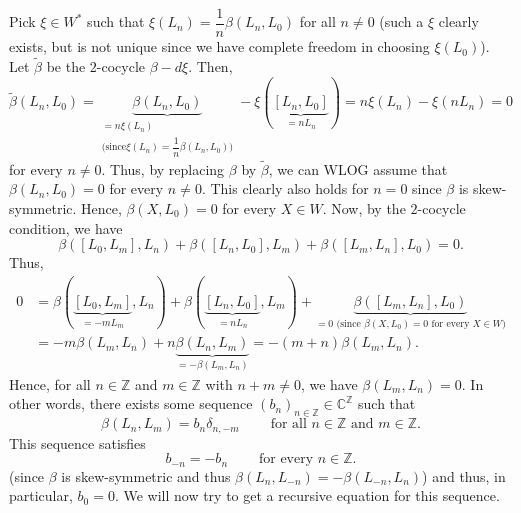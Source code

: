 \documentclass
[numbers=enddot,12pt,final,onecolumn,german,notitlepage]{scrartcl}%
\theoremstyle{definition}
\begin{document}
Pick $\xi\in W^{\ast}$ such that $\xi\left(  L_{n}\right)  =\dfrac{1}{n}%
\beta\left(  L_{n},L_{0}\right)  $ for all $n\neq0$ (such a $\xi$ clearly
exists, but is not unique since we have complete freedom in choosing
$\xi\left(  L_{0}\right)  $). Let $\widetilde{\beta}$ be the $2$-cocycle
$\beta-d\xi$. Then,
\[
\widetilde{\beta}\left(  L_{n},L_{0}\right)  =\underbrace{\beta\left(
L_{n},L_{0}\right)  }_{\substack{=n\xi\left(  L_{n}\right)  \\\text{(since
}\xi\left(  L_{n}\right)  =\dfrac{1}{n}\beta\left(  L_{n},L_{0}\right)
\text{)}}}-\xi\left(  \underbrace{\left[  L_{n},L_{0}\right]  }_{=nL_{n}%
}\right)  =n\xi\left(  L_{n}\right)  -\xi\left(  nL_{n}\right)  =0
\]
for every $n\neq0$. Thus, by replacing $\beta$ by $\widetilde{\beta}$, we can
WLOG assume that $\beta\left(  L_{n},L_{0}\right)  =0$ for every $n\neq0$.
This clearly also holds for $n=0$ since $\beta$ is skew-symmetric. Hence,
$\beta\left(  X,L_{0}\right)  =0$ for every $X\in W$. Now, by the $2$-cocycle
condition, we have%
\[
\beta\left(  \left[  L_{0},L_{m}\right]  ,L_{n}\right)  +\beta\left(  \left[
L_{n},L_{0}\right]  ,L_{m}\right)  +\beta\left(  \left[  L_{m},L_{n}\right]
,L_{0}\right)  =0.
\]
Thus,%
\begin{align*}
0  &  =\beta\left(  \underbrace{\left[  L_{0},L_{m}\right]  }_{=-mL_{m}}%
,L_{n}\right)  +\beta\left(  \underbrace{\left[  L_{n},L_{0}\right]
}_{=nL_{n}},L_{m}\right)  +\underbrace{\beta\left(  \left[  L_{m}%
,L_{n}\right]  ,L_{0}\right)  }_{=0\text{ (since }\beta\left(  X,L_{0}\right)
=0\text{ for every }X\in W\text{)}}\\
&  =-m\beta\left(  L_{m},L_{n}\right)  +n\underbrace{\beta\left(  L_{n}%
,L_{m}\right)  }_{=-\beta\left(  L_{m},L_{n}\right)  }=-\left(  m+n\right)
\beta\left(  L_{m},L_{n}\right)  .
\end{align*}
Hence, for all $n\in\mathbb{Z}$ and $m\in\mathbb{Z}$ with $n+m\neq0$, we have
$\beta\left(  L_{m},L_{n}\right)  =0$. In other words, there exists some
sequence $\left(  b_{n}\right)  _{n\in\mathbb{Z}}\in\mathbb{C}^{\mathbb{Z}}$
such that
\begin{equation}
\beta\left(  L_{n},L_{m}\right)  =b_{n}\delta_{n,-m}%
\ \ \ \ \ \ \ \ \ \ \text{for all }n\in\mathbb{Z}\text{ and }m\in\mathbb{Z}.
\label{thm.H^2(W).pf.2}%
\end{equation}
This sequence satisfies
\begin{equation}
b_{-n}=-b_{n}\ \ \ \ \ \ \ \ \ \ \text{for every }n\in\mathbb{Z}.
\label{thm.H^2(W).pf.1}%
\end{equation}
(since $\beta$ is skew-symmetric and thus $\beta\left(  L_{n},L_{-n}\right)
=-\beta\left(  L_{-n},L_{n}\right)  $) and thus, in particular, $b_{0}=0$. We
will now try to get a recursive equation for this sequence.
\end{document}
